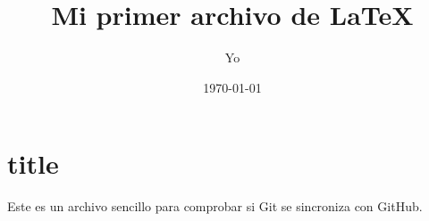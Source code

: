 \documentclass{article}
\author{Yo}
\title{Mi primer archivo de \LaTeX}
\date{\today}
\begin{document}
	\maketitle
	
	\section{title}
	Este es un archivo sencillo para comprobar si Git se sincroniza con GitHub.
\end{document}
